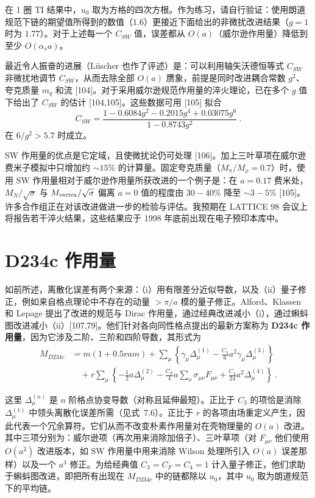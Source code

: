 在 1 圈 TI 结果中，$u_0$ 取为方格的四次方根。作为练习，请自行验证：使用朗道规范下链的期望值所得到的数值（$1.6$）更接近下面给出的非微扰改进结果（$g=1$ 时为 $1.77$）。对于上述每一个 $C_{SW}$ 值，误差都从 $O(a)$（威尔逊作用量）降低到至少 $O(\alpha_s a)$。

最近令人振奋的进展（L\"uscher 也作了评述）是：可以利用轴矢沃德恒等式 $C_{SW}$ 非微扰地调节 $C_{SW}$，从而去除全部 $O(a)$ 赝象，前提是同时改进耦合常数 $g^2$、夸克质量 $m_q$ 和流 [104]。对于采用威尔逊规范作用量的淬火理论，已在多个 $g$ 值下给出了 $C_{SW}$ 的估计 [104,105]。这些数据可用 [105] 拟合
\begin{equation}
C_{SW} = \frac{1 - 0.6084 g^2 - 0.2015 g^4 + 0.03075 g^6}{1 - 0.8743 g^2} \ .
\label{eq:CSWnonpert}
\end{equation}
在 $6/g^2 > 5.7$ 时成立。

SW 作用量的优点是它定域，且使微扰论仍可处理 [106]。加上三叶草项在威尔逊费米子模拟中只增加约 $\sim 15\%$ 的计算量。固定夸克质量（$M_\pi/M_\rho = 0.7$）时，使用 SW 作用量相对于威尔逊作用量所获改进的一个例子是：在 $a=0.17$ 费米处，$M_N/\sqrt{\sigma}$ 与 $M_{\rm vector}/\sqrt{\sigma}$ 偏离 $a=0$ 值的程度由 $30-40\%$ 降至 $\sim 3-5\%$ [105]。许多合作组正在对该改进做进一步的检验与评估。我预期在 LATTICE 98 会议上将报告若干淬火结果，这些结果应于 1998 年底前出现在电子预印本库中。

\section{D234c 作用量}

如前所述，离散化误差有两个来源：（i）用有限差分近似导数，以及（ii）量子修正，例如来自格点理论中不存在的动量 $> \pi/a$ 模的量子修正。Alford、Klassen 和 Lepage 提出了改进的规范与 Dirac 作用量，通过经典改进减小（i），通过蝌蚪图改进减小（ii）[107,79]。他们针对各向同性格点提出的最新方案称为 \textbf{D234c 作用量}，因为它涉及二阶、三阶和四阶导数，其形式为
\begin{align}
M_{D234c}
&= m(1+0.5 r a m) + \sum_\mu \left\{ \gamma_\mu \Delta_\mu^{(1)}
   - \frac{C_3}{6} a^2 \gamma_\mu \Delta_\mu^{(3)} \right\} \nonumber\\
&\quad + r \sum_\mu \left\{ - \frac{1}{2} a \Delta_\mu^{(2)}
   - \frac{C_F}{4} a \sum_\nu \sigma_{\mu\nu} F_{\mu\nu}
   + \frac{C_4}{24} a^2 \Delta_\mu^{(4)} \right\} \ .
\label{eq:D234caction}
\end{align}

这里 $\Delta_\mu^{(n)}$ 是 $n$ 阶格点协变导数（对称且延伸最短）。正比于 $C_3$ 的项恰是消除 $\Delta_\mu^{(1)}$ 中领头离散化误差所需（见式~7.6）。正比于 $r$ 的各项由场重定义产生，因此代表一个冗余算符。它们从而不改变朴素作用量对在壳物理量的 $O(a)$ 改进。其中三项分别为：威尔逊项（再次用来消除加倍子）、三叶草项（对 $F_{\mu\nu}$ 他们使用 $O(a^2)$ 改进版本，如 SW 作用量中用来消除 Wilson 处理所引入 $O(a)$ 误差那样）以及一个 $a^3$ 修正。为给经典值 $C_3 = C_F = C_4 = 1$ 计入量子修正，他们求助于蝌蚪图改进，即把所有出现在 $M_{D234c}$ 中的链都除以 $u_0$，其中 $u_0$ 取为朗道规范下的平均链。


